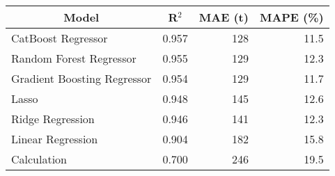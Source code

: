 
\begin{tabular}[t]{lrrr}
\toprule
\multicolumn{1}{c}{Model} & \multicolumn{1}{c}{R$^2$} & \multicolumn{1}{c}{MAE (t)} & \multicolumn{1}{c}{MAPE (\%)}\\
\midrule
CatBoost Regressor & 0.957 & 128 & 11.5\\
Random Forest Regressor & 0.955 & 129 & 12.3\\
Gradient Boosting Regressor & 0.954 & 129 & 11.7\\
Lasso & 0.948 & 145 & 12.6\\
Ridge Regression & 0.946 & 141 & 12.3\\
Linear Regression & 0.904 & 182 & 15.8\\
Calculation & 0.700 & 246 & 19.5\\
\bottomrule
\end{tabular}
